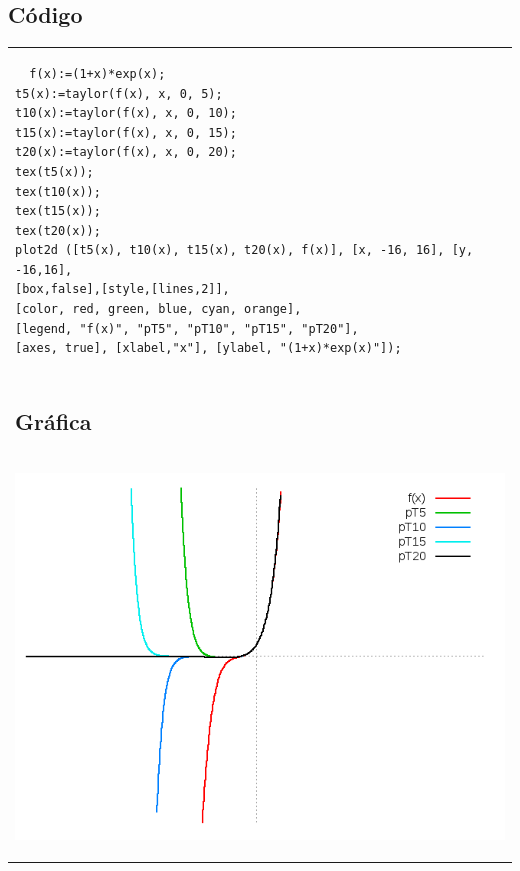 \documentclass[10pt]{article}
\begin{document}
\subsection{Código}
\begin{tabular}{l}
\begin{verbatim}  
  f(x):=(1+x)*exp(x);
t5(x):=taylor(f(x), x, 0, 5);
t10(x):=taylor(f(x), x, 0, 10);
t15(x):=taylor(f(x), x, 0, 15);
t20(x):=taylor(f(x), x, 0, 20);
tex(t5(x));
tex(t10(x));
tex(t15(x));
tex(t20(x));
plot2d ([t5(x), t10(x), t15(x), t20(x), f(x)], [x, -16, 16], [y, -16,16],
[box,false],[style,[lines,2]],
[color, red, green, blue, cyan, orange], 
[legend, "f(x)", "pT5", "pT10", "pT15", "pT20"],
[axes, true], [xlabel,"x"], [ylabel, "(1+x)*exp(x)"]);
\end{verbatim} \\
\subsection{Gráfica}\\
\begin{center}
  
    \includegraphics[scale=0.4]{1xexp}
\end{center}
\end{tabular}


\end{document}
